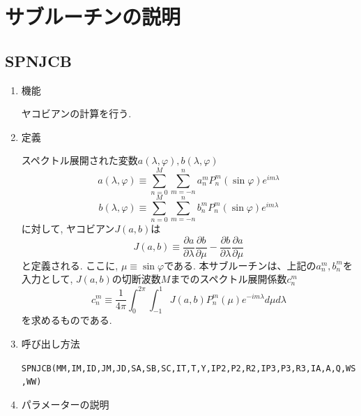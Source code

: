 \documentclass[a4j,fleqn]{jarticle}
\begin{document}

\section{サブルーチンの説明}

\subsection{SPNJCB}

\begin{enumerate}

\item 機能

 ヤコビアンの計算を行う.

\item 定義

スペクトル展開された変数$a(\lambda,\varphi), b(\lambda,\varphi)$
\begin{equation}
a(\lambda,\varphi)\equiv\sum_{n=0}^M\sum_{m=-n}^n 
a^m_n P^m_n(\sin\varphi) e^{im\lambda}
\end{equation}
\begin{equation}
b(\lambda,\varphi)\equiv\sum_{n=0}^M\sum_{m=-n}^n
b^m_n P^m_n(\sin\varphi) e^{im\lambda}
\end{equation}
に対して, ヤコビアン$J(a,b)$は
\begin{equation}
J(a,b)\equiv
 \frac{\partial a}{\partial\lambda}\frac{\partial b}{\partial\mu}
-\frac{\partial b}{\partial\lambda}\frac{\partial a}{\partial\mu}
\end{equation}
と定義される. ここに, $\mu\equiv\sin\varphi$である.
本サブルーチンは、上記の$a^m_n, b^m_n$を入力として,
$J(a,b)$の切断波数$M$までのスペクトル展開係数$c^m_n$
\begin{equation}
c^m_n\equiv\frac1{4\pi}\int^{2\pi}_0\int^1_{-1}J(a,b)P^m_n(\mu)
e^{-im\lambda}d\mu d\lambda
\end{equation}
を求めるものである.

\item 呼び出し方法 

{\tt SPNJCB(MM,IM,ID,JM,JD,SA,SB,SC,IT,T,Y,IP2,P2,R2,IP3,P3,R3,IA,A,Q,WS,WW)}
  
\item パラメーターの説明


\end{enumerate}
\end{document}
